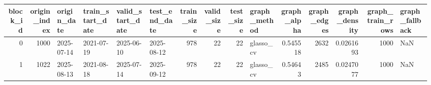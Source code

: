 \begin{tabular}{rrllllrrrlrrrrl}
\toprule
block_id & origin_index & origin_date & train_start_date & valid_start_date & test_end_date & train_size & valid_size & test_size & graph_method & graph_alpha & graph_edges & graph_density & graph_train_rows & graph_fallback \\
\midrule
0 & 1000 & 2025-07-14 & 2021-07-19 & 2025-06-10 & 2025-08-12 & 978 & 22 & 22 & glasso_cv & 0.545518 & 2632 & 0.0261693 & 1000 & NaN \\
1 & 1022 & 2025-08-13 & 2021-08-18 & 2025-07-14 & 2025-09-12 & 978 & 22 & 22 & glasso_cv & 0.54643 & 2485 & 0.0247077 & 1000 & NaN \\
\bottomrule
\end{tabular}
